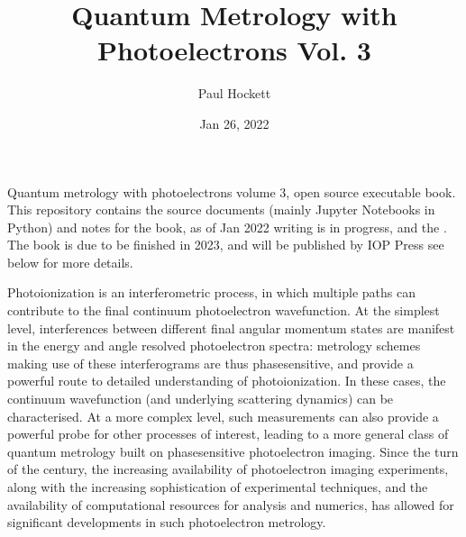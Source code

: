 \documentclass[letterpaper,10pt,english]{jupyterBook}
\title{Quantum Metrology with Photoelectrons Vol. 3}
\date{Jan 26, 2022}
\author{Paul Hockett}
\begin{document}
\pagestyle{empty}
\sphinxmaketitle
\pagestyle{plain}
\sphinxtableofcontents
\pagestyle{normal}
\label{\detokenize{intro::doc}}


\sphinxAtStartPar
Quantum metrology with photoelectrons volume 3, open source executable book. This repository contains the source documents (mainly Jupyter Notebooks in Python) and notes for the book, as of Jan 2022 writing is in progress, and the . The book is due to be finished in 2023, and will be published by IOP Press \sphinxhyphen{} see below for more details.

\begin{DUlineblock}{0em}
\item[] 
\end{DUlineblock}

\sphinxAtStartPar
Photoionization is an interferometric process, in which multiple paths can contribute to the final continuum photoelectron wavefunction. At the simplest level, interferences between different final angular momentum states are manifest in the energy and angle resolved photoelectron spectra: metrology schemes making use of these interferograms are thus phase\sphinxhyphen{}sensitive, and provide a powerful route to detailed understanding of photoionization. In these cases, the continuum wavefunction (and underlying scattering dynamics) can be characterised. At a more complex level, such measurements can also provide a powerful probe for other processes of interest, leading to a more general class of quantum metrology built on phase\sphinxhyphen{}sensitive photoelectron imaging.  Since the turn of the century, the increasing availability of photoelectron imaging experiments, along with the increasing sophistication of experimental techniques, and the availability of computational resources for analysis and numerics, has allowed for significant developments in such photoelectron metrology.

\begin{DUlineblock}{0em}
\item[] 
\end{DUlineblock}
\end{document}

